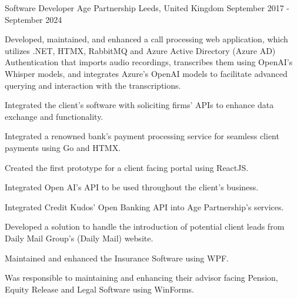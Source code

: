 \begin{cventries}
  \cventry
    {Software Developer} %
    {Age Partnership} %
    {Leeds, United Kingdom} %
    {September 2017 - September 2024} %
    {
      \begin{cvitems} %
        \item {Developed, maintained, and enhanced a call processing web application, which utilizes .NET, HTMX, RabbitMQ and Azure Active Directory (Azure AD) Authentication that imports audio recordings, transcribes them using OpenAI's Whisper models, and integrates Azure's OpenAI models to facilitate advanced querying and interaction with the transcriptions. }
        \vspace{0.7em} %
         \item {Integrated the client's software with soliciting firms' APIs to enhance data exchange and functionality. }
         \vspace{0.7em} %
        \item {Integrated a renowned bank's payment processing service for seamless client payments using Go and HTMX. }
        \vspace{0.7em} %
        \item {Created the first prototype for a client facing portal using ReactJS. }
        \vspace{0.7em} %
        \item {Integrated Open AI's API to be used throughout the client's business. }
        \item {Integrated Credit Kudos' Open Banking API into Age Partnership's services. }
        \vspace{0.7em} %
        \item {Developed a solution to handle the introduction of potential client leads from Daily Mail Group's (Daily Mail) website. }
        \vspace{0.7em} %
        \item {Maintained and enhanced the Insurance Software using WPF.}
        \vspace{0.7em} %
        \item {Was responsible to maintaining and enhancing their advisor facing Pension, Equity Release and Legal Software using WinForms.}
      \end{cvitems}
    }

\end{cventries}
